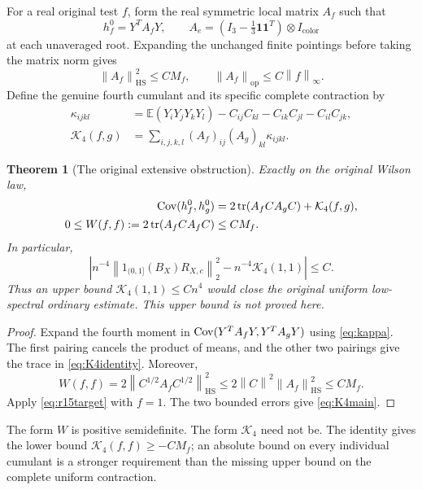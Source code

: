 \documentclass[11pt,letterpaper]{article}
\newtheorem{theorem}{Theorem}[section]
\theoremstyle{remark}\newtheorem{remark}[theorem]{Remark}
\newcommand{\E}{\mathbb E}
\newcommand{\tr}{\operatorname{tr}}\newcommand{\Tr}{\operatorname{Tr}}
\newcommand{\norm}[1]{\left\lVert#1\right\rVert}
\newcommand{\cK}{\mathcal K}\newcommand{\cC}{\mathcal C}
\begin{document}
For a real original test \(f\), form the real symmetric local matrix \(A_f\) such that
\[
 h_f^0=Y^TA_fY,\qquad
 A_e=(I_3-\tfrac13\boldsymbol1\boldsymbol1^T)\otimes I_{\mathrm{color}}
\]
at each unaveraged root. Expanding the unchanged finite pointings before taking the matrix norm gives
\begin{equation}\label{eq:Af}
 \norm{A_f}_{\mathrm{HS}}^2\le CM_f,
 \qquad \norm{A_f}_{\mathrm{op}}\le C\norm f_\infty.
\end{equation}
Define the genuine fourth cumulant and its specific complete contraction by
\begin{align}\label{eq:kappa}
 \kappa_{ijkl}&=\E(Y_iY_jY_kY_l)
 -C_{ij}C_{kl}-C_{ik}C_{jl}-C_{il}C_{jk},\\
 \cK_4(f,g)&=\sum_{i,j,k,l}(A_f)_{ij}(A_g)_{kl}\kappa_{ijkl}.\nonumber
\end{align}

\begin{theorem}[The original extensive obstruction]\label{thm:K4}
Exactly on the original Wilson law,
\begin{align}\label{eq:K4identity}
 \Cov(h_f^0,h_g^0)&=2\tr(A_fCA_gC)+\cK_4(f,g),\\
 0\le W(f,f):=2\tr(A_fCA_fC)&\le CM_f.\nonumber
\end{align}
In particular,
\begin{equation}\label{eq:K4main}
 \left|n^{-4}\norm{1_{(0,1]}(B_X)R_{X,c}}_2^2
       -n^{-4}\cK_4(1,1)\right|\le C.
\end{equation}
Thus an upper bound \(\cK_4(1,1)\le Cn^4\) would close the original uniform low-spectral ordinary estimate. This upper bound is not proved here.
\end{theorem}
\begin{proof}
Expand the fourth moment in \(\operatorname{Cov}(Y^TA_fY,Y^TA_gY)\) using \eqref{eq:kappa}. The first pairing cancels the product of means, and the other two pairings give the trace in \eqref{eq:K4identity}. Moreover,
\[
 W(f,f)=2\norm{C^{1/2}A_fC^{1/2}}_{\mathrm{HS}}^2
 \le2\norm C^2\norm{A_f}_{\mathrm{HS}}^2\le CM_f.
\]
Apply \eqref{eq:r15target} with \(f=1\). The two bounded errors give \eqref{eq:K4main}.
\end{proof}

The form \(W\) is positive semidefinite. The form \(\cK_4\) need not be. The identity gives the lower bound \(\cK_4(f,f)\ge-CM_f\); an absolute bound on every individual cumulant is a stronger requirement than the missing upper bound on the complete uniform contraction.
\end{document}
